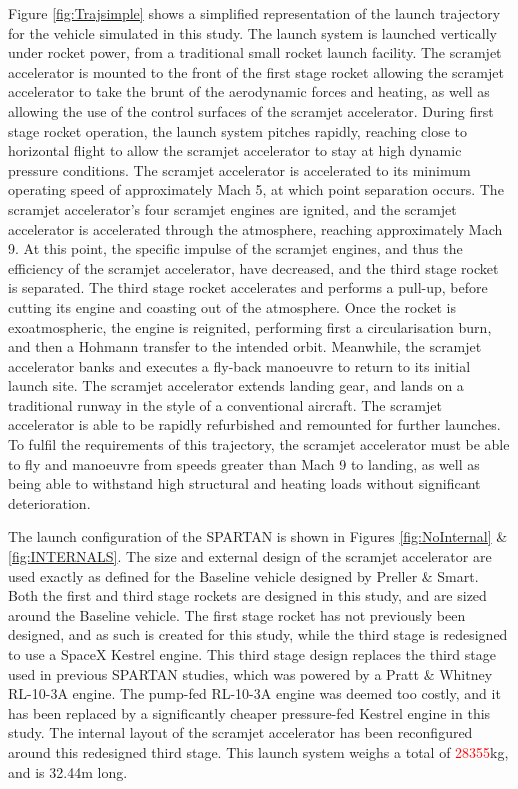  Figure \ref{fig:Trajsimple} shows a simplified representation of the launch trajectory for the vehicle simulated in this study.
 The launch system is launched vertically under rocket power, from a traditional small rocket launch facility. The scramjet accelerator is mounted to the front of the first stage rocket allowing the scramjet accelerator to take the brunt of the aerodynamic forces and heating, as well as allowing the use of the control surfaces of the scramjet accelerator. During first stage rocket operation, the launch system pitches rapidly, reaching close to horizontal flight to allow the scramjet accelerator to stay at high dynamic pressure conditions. The scramjet accelerator is accelerated to its minimum operating speed of approximately Mach 5, at which point separation occurs. The scramjet accelerator's four scramjet engines are ignited, and the scramjet accelerator is accelerated through the atmosphere, reaching approximately Mach 9. At this point, the specific impulse of the scramjet engines, and thus the efficiency of the scramjet accelerator, have decreased, and the third stage rocket is separated. The third stage rocket accelerates and performs a pull-up, before cutting its engine and coasting out of the atmosphere. Once the rocket is exoatmospheric, the engine is reignited, performing first a circularisation burn, and then a Hohmann transfer to the intended orbit. Meanwhile, the scramjet accelerator banks and executes a fly-back manoeuvre to return to its initial launch site. The scramjet accelerator extends landing gear, and lands on a traditional runway in the style of a conventional aircraft. The scramjet accelerator is able to be rapidly refurbished and remounted for further launches. To fulfil the requirements of this trajectory, the scramjet accelerator must be able to fly and manoeuvre from speeds greater than Mach 9 to landing, as well as being able to withstand high structural and heating loads without significant deterioration.
 
 The launch configuration of the SPARTAN is shown in Figures \ref{fig:NoInternal} \& \ref{fig:INTERNALS}. 
 The size and external design of the scramjet accelerator are used exactly as defined for the Baseline vehicle designed by Preller \& Smart\cite{Preller2017b}. Both the first and third stage rockets are designed in this study, and are sized around the Baseline vehicle. 
 The first stage rocket has not previously been designed, and as such is created for this study, while the third stage is redesigned to use a SpaceX Kestrel engine. This third stage design replaces the third stage used in previous SPARTAN studies, which was powered by a Pratt \& Whitney RL-10-3A engine\cite{Preller2017b}. The pump-fed RL-10-3A engine was deemed too costly, and it has been replaced by a significantly cheaper pressure-fed Kestrel engine in this study.  
 The internal layout of the scramjet accelerator has been reconfigured around this redesigned third stage. 
 This launch system weighs a total of \textcolor{red}{28355}kg, and is 32.44m long. 
 

